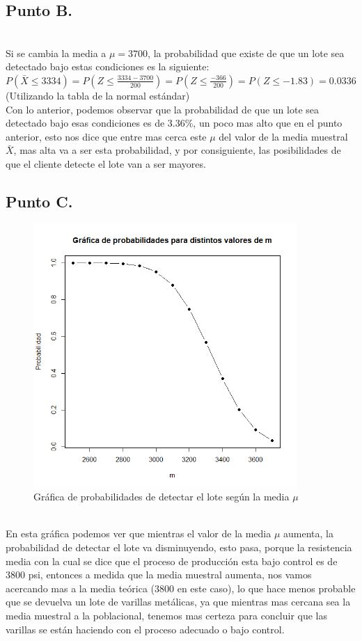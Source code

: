 \documentclass[letterpaper,12pt,onecolumn,titlepage]{article}
\begin{document}
\subsection{Punto B.}
~\\ Si se cambia la media a $\mu=3700$, la probabilidad que existe de que un lote sea detectado bajo estas condiciones es la siguiente:
~\\ $P(\bar{X}\leq3334)=P(Z\leq\frac{3334-3700}{200})=P(Z\leq\frac{-366}{200})=P(Z\leq-1.83)=0.0336$ (Utilizando la tabla de la normal est\'{a}ndar)
~\\ Con lo anterior, podemos observar que la probabilidad de que un lote sea detectado bajo esas condiciones es de 3.36\%, un poco mas alto que en el punto anterior, esto nos dice que entre mas cerca este $\mu$ del valor de la media muestral $\bar{X}$, mas alta va a ser esta probabilidad, y por consiguiente, las posibilidades de que el cliente detecte el lote van a ser mayores.
\pagebreak \subsection{Punto C.}
\begin{figure}[!h]
    \begin{center}
        \includegraphics[width=10cm]{Figuras/5.png}
        \caption{Gr\'{a}fica de probabilidades de detectar el lote seg\'{u}n la media $\mu$}
        \label{fig:Densidad}
    \end{center}
\end{figure}
~\\ En esta gr\'{a}fica podemos ver que mientras el valor de la media $\mu$ aumenta, la probabilidad de detectar el lote va disminuyendo, esto pasa, porque la resistencia media con la cual se dice que el proceso de producci\'{o}n esta bajo control es de 3800 psi, entonces a medida que la media muestral aumenta, nos vamos acercando mas a la media te\'{o}rica (3800 en este caso), lo que hace menos probable que se devuelva un lote de varillas met\'{a}licas, ya que mientras mas cercana sea la media muestral a la poblacional, tenemos mas certeza para concluir que las varillas se est\'{a}n haciendo con el proceso adecuado o bajo control.
\end{document}
